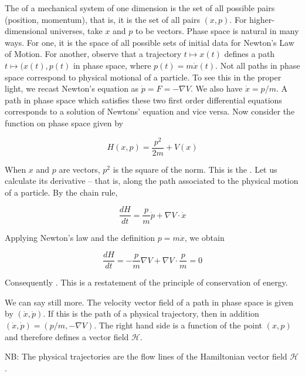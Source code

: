 The  of a mechanical system of one dimension is the set of all possible pairs (position, momentum), that is, it is the set of all pairs
$(x,p)$.  For higher-dimensional universes, take $x$ and $p$ to be vectors.  Phase space is natural in many ways.  For one, it is the space of all possible sets of initial data for Newton's Law of Motion.  For another, observe that a trajectory $t \mapsto x(t)$ defines a path $t \mapsto (x(t), p(t)$ in phase space, where $p(t) = m\dot x(t)$.  Not all paths in phase space correspond to physical motional of a particle.  To see this in the proper light, we recast Newton's equation as $\dot p = F = -\nabla V$.  We also have $\dot x = p/m$.   A path in phase space which satisfies these two first order differential equations corresponds to a solution of Newtons' equation and vice versa.   Now consider the function on phase space given by

\begin{equation}
H(x, p) = \frac{p^2}{2m} + V(x)
\end{equation}

When $x$ and $p$ are vectors, $p^2$ is the square of the norm.  This is the .  Let us calculate its derivative  -- that is, along the path associated to the physical motion of a particle.  By the chain rule,

\begin{equation}
\frac{dH}{dt} = \frac{p}{m} \dot p + \nabla V\cdot \dot x
\end{equation}

Applying Newton's law and the definition $p = m\dot x $, we
obtain

\begin{equation}
\frac{dH}{dt} = -\frac{p}{m} \nabla V + \nabla V\cdot \frac{p}{m} = 0
\end{equation}

Consequently .  This is a restatement of the principle of conservation of energy.

We can say still more.  The velocity vector field of a path in phase space is given by $(\dot x, \dot p)$.  If this is the path of a physical trajectory, then in addition      $(\dot x, \dot p) = (p/m, -\nabla V)$.  The right hand side is a function of the point $(x,p)$ and therefore defines a vector field $\mathcal{H}$.

NB: The physical trajectories are the flow lines of the Hamiltonian vector field $\mathcal{H}$.



